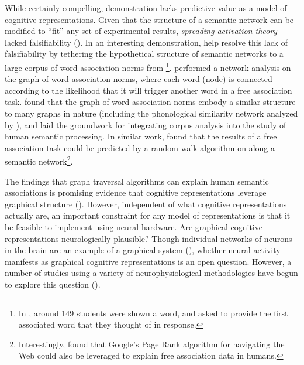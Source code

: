 \documentclass[12pt]{article}
\let\oldcite=\cite
\let\oldtextcite=\textcite
\renewcommand{\cite}[1]{\textcolor[rgb]{0, .121, .388}{\oldcite{#1}}}
\renewcommand{\textcite}[1]{\textcolor[rgb]{0, .121, .388}{\oldtextcite{#1}}}
\begin{document}
While certainly compelling, \textcite{collins1969retrieval} demonstration lacks predictive value as a model of cognitive representations. Given that the structure of a semantic network can be modified to ``fit'' any set of experimental results, \emph{spreading-activation theory} lacked falsifiability (\cite{o2009conceptual}). In an interesting demonstration, \textcite{steyvers2005large} help resolve this lack of falsifiability by tethering the hypothetical structure of semantic networks to a large corpus of word association norms from \textcite{nelson2004university}\footnote{In \textcite{nelson2004university}, around 149 students were shown a word, and asked to provide the first associated word that they thought of in response.}. \textcite{steyvers2005large} performed a network analysis on the graph of word association norms, where each word (node) is connected according to the likelihood that it will trigger another word in a free association task. \textcite{steyvers2005large} found that the graph of word association norms embody a similar structure to many graphs in nature (including the phonological similarity network analyzed by \cite{vitevitch2008can}), and laid the groundwork for integrating corpus analysis into the study of human semantic processing. In similar work, \cite{abbott2012human} found that the results of a free association task could be predicted by a random walk algorithm on along a semantic network\footnote{Interestingly, \textcite{griffiths2007google} found that Google's Page Rank algorithm for navigating the Web could also be leveraged to explain free association data in humans.}. 

The findings that graph traversal algorithms can explain human semantic associations is promising evidence that cognitive representations leverage graphical structure (\cite{steyvers2005large,abbott2012human,griffiths2007google}). However, independent of what cognitive representations actually are, an important constraint for any model of representations is that it be feasible to implement using neural hardware. Are graphical cognitive representations neurologically plausible? Though individual networks of neurons in the brain are an example of a graphical system (\cite{newman2003structure,bullock2005neuron}), whether neural activity manifests as graphical cognitive representations is an open question. However, a number of studies using a variety of neurophysiological methodologies have begun to explore this question (\cite{garvert2017map,schapiro2013neural,bassett2010efficient}).
\end{document}
